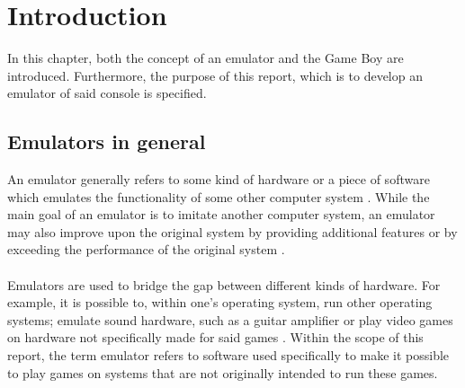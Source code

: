 \chapter{Introduction}
In this chapter, both the concept of an emulator and the Game Boy are introduced. Furthermore, the purpose of this report, which is to develop an emulator of said console is specified.
\section{Emulators in general}
An emulator generally refers to some kind of hardware or a piece of software which emulates the functionality of some other computer system \cite{emulatortechnopedia} \cite{emulatorlifewire}. While the main goal of an emulator is to imitate another computer system, an emulator may also improve upon the original system by providing additional features or by exceeding the performance of the original system \cite{emulatorlifewire}.\\
\\
Emulators are used to bridge the gap between different kinds of hardware. For example, it is possible to, within one's operating system, run other operating systems; emulate sound hardware, such as a guitar amplifier or play video games on hardware not specifically made for said games \cite{emulatorbusinessinsider}. Within the scope of this report, the term emulator refers to software used specifically to make it possible to play games on systems that are not originally intended to run these games.
